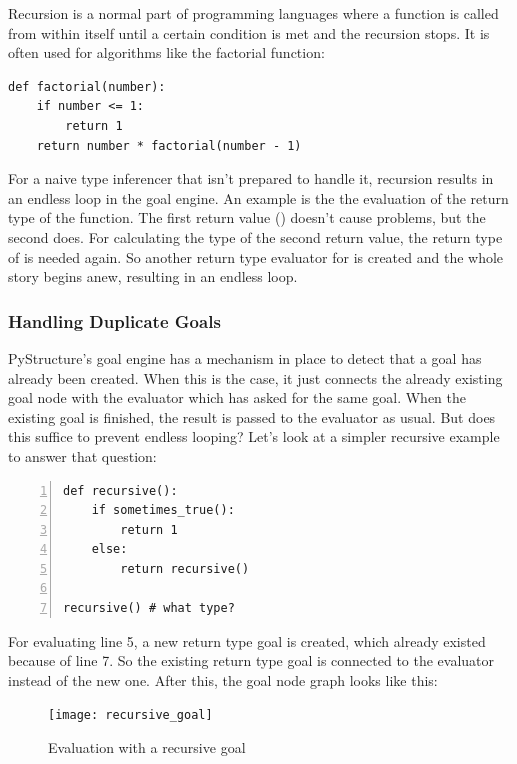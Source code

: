 \documentclass[12pt,halfparskip,DIV11,BCOR10mm]{scrreprt}
\begin{document}
Recursion is a normal part of programming languages where a function is called from within itself until a certain condition is met and the recursion stops. It is often used for algorithms like the factorial function:

\begin{lstlisting}
def factorial(number):
    if number <= 1:
        return 1
    return number * factorial(number - 1)
\end{lstlisting}

For a naive type inferencer that isn't prepared to handle it, recursion results in an endless loop in the goal engine. An example is the the evaluation of the return type of the  function. The first return value () doesn't cause problems, but the second does. For calculating the type of the second return value, the return type of  is needed again. So another return type evaluator for  is created and the whole story begins anew, resulting in an endless loop.

\subsubsection{Handling Duplicate Goals}

PyStructure's goal engine has a mechanism in place to detect that a goal has already been created. When this is the case, it just connects the already existing goal node with the evaluator which has asked for the same goal. When the existing goal is finished, the result is passed to the evaluator as usual. But does this suffice to prevent endless looping? Let's look at a simpler recursive example to answer that question:

\begin{lstlisting}[numbers=left]
def recursive():
    if sometimes_true():
        return 1
    else:
        return recursive()

recursive() # what type?
\end{lstlisting}

For evaluating line 5, a new return type goal is created, which already existed because of line 7. So the existing return type goal is connected to the evaluator instead of the new one. After this, the goal node graph looks like this:

\begin{figure}[H]
    \centering
    \texttt{[image: recursive\_goal]}
    \label{fig:recursive_goal}
    \caption{Evaluation with a recursive goal}
\end{figure}
\end{document}
